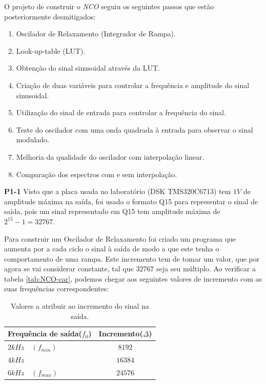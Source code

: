 \documentclass[11pt]{article}
\begin{document}
O projeto de construir o \textit{NCO} seguiu os seguintes passos que estão posteriormente desmitigados:

\begin{enumerate}
	\item Oscilador de Relaxamento (Integrador de Rampa). %
	\item Look-up-table (LUT). %
	\item Obtenção do sinal sinusoidal através da LUT.%
	\item Criação de duas variáveis para controlar a frequência e amplitude do sinal sinusoidal. %
	\item Utilização do sinal de entrada para controlar a frequência do sinal. %
	\item Teste do oscilador com uma onda quadrada à entrada para observar o sinal modulado.  %
	\item Melhoria da qualidade do oscilador com interpolação linear. %
	\item Comparação dos espectros com e sem interpolação.%
\end{enumerate}
\pagebreak

\textbf{P1-1}
\label{para:P1-1}
 Visto que a placa usada no laboratório (DSK TMS320C6713) tem $1 V$ de amplitude máxima na saída, foi usado o formato Q15 para representar o sinal de saída, pois um sinal representado em Q15 tem amplitude máxima de $2^{15}-1 = 32767 $.

Para construir um Oscilador de Relaxamento foi criado um programa que aumenta por a cada ciclo o sinal à saída de modo a que este tenha o comportamento de uma rampa. Este incremento tem de tomar um valor, que por agora se vai considerar constante, tal que $32767$ seja seu múltiplo. Ao verificar a tabela \ref{tab:NCO-car}, podemos chegar aos seguintes valores de incremento com as suas frequências correspondentes:


\begin{table}[H]
	\centering
	\caption{Valores a atribuir ao incremento do sinal na saída.}
	\label{tab:incrementos}
	\begin{tabular}[c]{|l||c|}
		\hline \textbf{Frequência de saída($f_0$)} & \textbf{Incremento($\Delta$)}\\ 
		\hline $ 2 kHz \quad (f_{min}) $ & $ 8192 $\\ 
		\hline $ 4 kHz $ & $ 16384 $  \\ 
		\hline $ 6 kHz \quad (f_{max}) $ & $ 24576 $ \\ 
		\hline
	\end{tabular}
\end{table}
\end{document}

